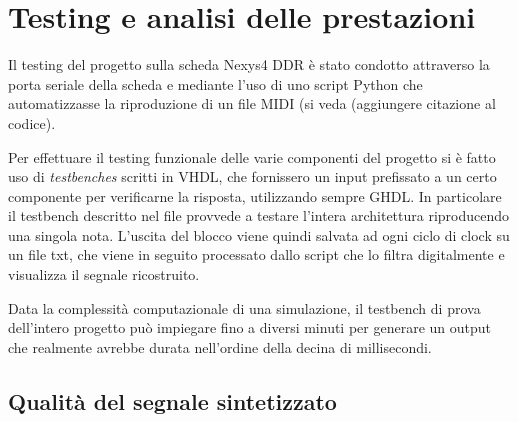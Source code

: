 \chapter{Testing e analisi delle prestazioni}
Il testing del progetto sulla scheda Nexys4 DDR è stato condotto
attraverso la porta seriale della scheda e mediante l'uso di uno
script Python che automatizzasse la riproduzione di un file MIDI 
(si veda  (aggiungere citazione al codice).

Per effettuare il testing funzionale delle varie componenti del progetto
si è fatto uso di \textit{testbenches} scritti in VHDL, che fornissero
un input prefissato a un certo componente per verificarne la risposta,
utilizzando sempre GHDL.
In particolare il testbench descritto nel file
  provvede a testare l'intera
architettura riproducendo una singola nota.
L'uscita del blocco  viene quindi salvata ad ogni
ciclo di clock su un file txt, che viene in seguito processato
dallo script  che lo filtra
digitalmente e visualizza il segnale ricostruito.

Data la complessità computazionale di una simulazione, il testbench
di prova dell'intero progetto può impiegare fino a diversi minuti
per generare un output che realmente avrebbe durata nell'ordine della
decina di millisecondi.

\section{Qualità del segnale sintetizzato}

